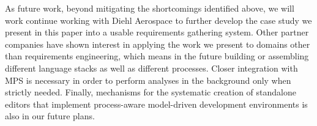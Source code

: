 As future work, beyond mitigating the shortcomings identified above, we will
work continue working with Diehl Aerospace to further develop the case study we
present in this paper into a usable requirements gathering system. Other partner companies
have shown interest in applying the work we present to domains other than
requirements engineering, which means in the future building or assembling
different language stacks as well as different processes. Closer integration
with MPS is necessary in order to perform analyses in the background only when
strictly needed. Finally, mechanisms for the systematic creation of standalone
editors that implement process-aware model-driven development environments
is also in our future plans.
